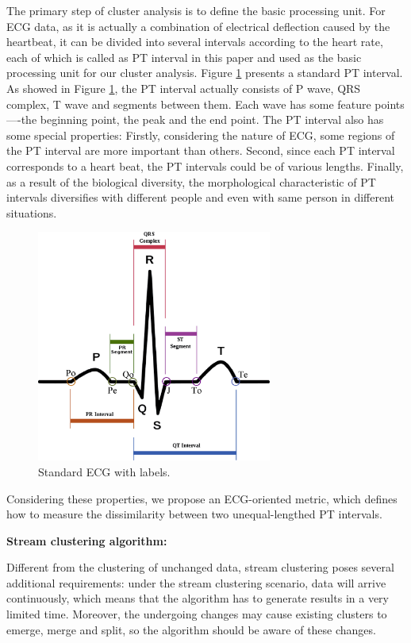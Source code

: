\documentclass[conference]{IEEEtran}
\begin{document}
The primary step of cluster analysis is to define the basic processing unit. For ECG data, as it is actually a combination of electrical deflection caused by the heartbeat, it can be divided into several intervals according to the heart rate, each of which is called as PT interval in this paper and used as the basic processing unit for our cluster analysis. Figure \ref{fig_ECG_lable} presents a standard PT interval. As showed in Figure \ref{fig_ECG_lable}, the PT interval actually consists of P wave, QRS complex, T wave and segments between them. Each wave has some feature points----the beginning point, the peak and the end point. The PT interval also has some special properties: Firstly, considering the nature of ECG, some regions of the PT interval are more important than others. Second, since each PT interval corresponds to a heart beat, the PT intervals could be of various lengths. Finally, as a result of the biological diversity, the morphological characteristic of PT intervals diversifies with different people and even with same person in different situations.
\begin{figure}[!t]
\centering
\includegraphics[height=3.0in]{./Figure/rr_interval_label.eps}
\caption{Standard ECG with labels.}
\label{fig_ECG_lable}
\end{figure}


Considering these properties, we propose an ECG-oriented metric, which defines how to measure the dissimilarity between two unequal-lengthed PT intervals.


\textbf{Stream clustering algorithm:}


Different from the clustering of unchanged data, stream clustering poses several additional requirements: under the stream clustering scenario, data will arrive continuously, which means that the algorithm has to generate results in a very limited time. Moreover, the undergoing changes may cause existing clusters to emerge, merge and split, so the algorithm should be aware of these changes.
\end{document}
